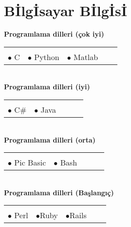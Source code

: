 \documentclass[10pt,a4paper]{article}
\begin{document}
\section{\sc B{\footnotesize İ}lg{\footnotesize İ}sayar B{\footnotesize İ}lg{\footnotesize İ}s{\footnotesize İ}}

{\bf Programlama dilleri (çok iyi)}\\
\hspace*{0.3in}\begin{tabular}{lrrrr}
\vspace{0.5 mm}\\
	$\bullet$ C &$\bullet$ Python &$\bullet$ Matlab & &\\
\end{tabular}
\vspace{0.5 mm}\\

{\bf Programlama dilleri (iyi)}\\
\hspace*{0.3in}\begin{tabular}{lrrrr}
\vspace{0.5 mm}\\
  $\bullet$ C$ \# $ &$\bullet$ Java & & &\\
\end{tabular}
\vspace{0.5 mm}\\

{\bf Programlama dilleri (orta)}\\
\hspace*{0.3in}\begin{tabular}{lrrrr}
\vspace{0.5 mm}\\
  $\bullet$ Pic Basic & $\bullet$ Bash & & &\\
\end{tabular}
\vspace{0.5 mm}\\

{\bf Programlama dilleri (Başlangıç)}\\
\hspace*{0.3in}\begin{tabular}{lrrrr}
\vspace{0.5 mm}\\
  $\bullet$ Perl & $\bullet$Ruby & $\bullet$Rails & &\\
\end{tabular}
\vspace{0.5 mm}\\
\end{document}
